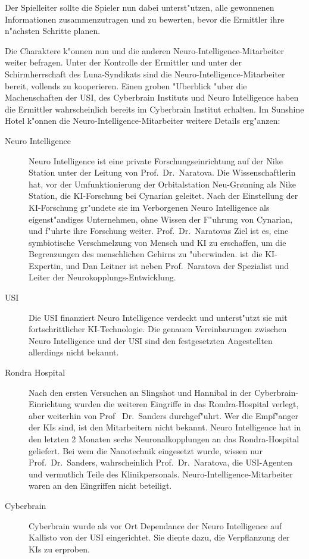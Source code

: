 Der Spielleiter sollte die Spieler nun dabei unterst"utzen, alle gewonnenen Informationen zusammenzutragen und zu bewerten, bevor die Ermittler ihre n"achsten Schritte planen.

Die Charaktere k"onnen nun \ml{} und die anderen Neuro-Intelligence-Mitarbeiter weiter befragen. Unter der Kontrolle der Ermittler und unter der Schirmherrschaft des Luna-Syndikats sind die Neuro-Intelligence-Mitarbeiter bereit, vollends zu kooperieren. Einen groben "Uberblick "uber die Machenschaften der USI, des Cyberbrain Instituts und Neuro Intelligence haben die Ermittler wahrscheinlich bereits im Cyberbrain Institut erhalten. Im Sunshine Hotel k"onnen die Neuro-Intelligence-Mitarbeiter weitere Details erg"anzen:

\begin{description}
	\item[Neuro Intelligence] Neuro Intelligence ist eine private Forschungseinrichtung auf der Nike Station unter der Leitung von 
		Prof.~Dr.~Naratova. Die Wissenschaftlerin hat, vor der Umfunktionierung der Orbitalstation Neu-Gr{\o}nning als Nike Station, die KI-Forschung bei Cynarian geleitet. Nach der Einstellung der KI-Forschung gr"undete sie im Verborgenen Neuro Intelligence als eigenst"andiges Unternehmen, ohne Wissen der F"uhrung von Cynarian, und f"uhrte ihre Forschung weiter. Prof.~Dr.~Naratovas Ziel ist es, eine symbiotische Verschmelzung von Mensch und KI zu erschaffen, um die Begrenzungen des menschlichen Gehirns zu "uberwinden. \ml{} ist die KI-Expertin, und Dan Leitner ist neben Prof.~Naratova der Spezialist und Leiter der Neurokopplungs-Entwicklung.
	\item[USI] Die USI finanziert Neuro Intelligence verdeckt und unterst"utzt sie mit fortschrittlicher KI-Technologie. Die genauen 
		Vereinbarungen zwischen Neuro Intelligence und der USI sind den festgesetzten Angestellten allerdings nicht bekannt.		
	\item[Rondra Hospital] Nach den ersten Versuchen an Slingshot und Hannibal in der Cyberbrain-Einrichtung wurden die weiteren Eingriffe 
		in das Rondra-Hospital verlegt, aber weiterhin von Prof~ Dr.~Sanders durchgef"uhrt. Wer die Empf"anger der KIs sind, ist den Mitarbeitern nicht bekannt. Neuro Intelligence hat in den letzten 2 Monaten sechs Neuronalkopplungen an das Rondra-Hospital geliefert. Bei wem die Nanotechnik eingesetzt wurde, wissen nur Prof.~Dr.~Sanders, wahrscheinlich Prof.~Dr.~Naratova, die 
		USI-Agenten und vermutlich Teile des Klinikpersonals. Neuro-Intelligence-Mitarbeiter waren an den Eingriffen nicht beteiligt.	
	\item[Cyberbrain] Cyberbrain wurde als vor Ort Dependance der Neuro Intelligence auf Kallisto von der USI eingerichtet. Sie diente 		
		dazu, die Verpflanzung der KIs zu erproben.
\end{description}	

